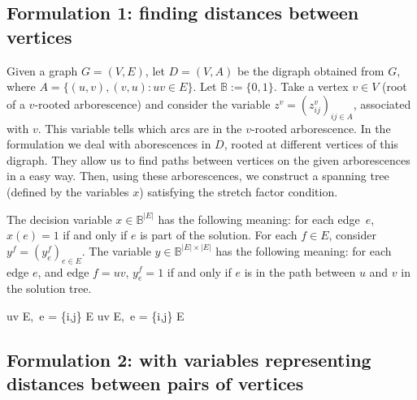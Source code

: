 \documentclass[12pt]{article}
\newcommand{\espacoXBinary}{\mathbb{B}^{|E|}}
\newcommand{\espacoYBinary}{\mathbb{B}^{|E| \times |E|}}
\newenvironment{absolutelynopagebreak}
  {\par\nobreak\vfil\penalty0\vfilneg
   \vtop\bgroup}
  {\par\xdef\tpd{\the\prevdepth}\egroup
   \prevdepth=\tpd}
\begin{document}
\subsection{Formulation 1: finding distances between vertices}
Given a graph $G=(V,E)$, let $D=(V,A)$ be the digraph obtained
from $G$, where $A = \{(u,v),(v,u): uv \in E\}$. Let
$\mathbb{B}:=\{0,1\}$. Take a vertex $v \in V$ (root of a \hbox{$v$-rooted}
arborescence) and consider the variable
$z^{v} = (z_{ij}^{v})_{ij \in A}$, associated with $v$. This variable
tells which arcs are in the $v$-rooted arborescence. 
%
In the formulation we deal with aborescences in $D$, rooted at
different vertices of this digraph. They allow us to find paths
between vertices on the given arborescences in a easy way. Then, using
these arborescences, we construct a spanning tree (defined by the
variables $x$) satisfying the stretch factor condition.

The decision variable $x \in \espacoXBinary$ has the following
meaning: for each edge~$e$, \hbox{$x(e) = 1$} if and only if $e$ is part of
the solution.  For each $f \in E$, consider
$y^{f} = (y^{f}_{e})_{e \in E}$. The variable $y \in \espacoYBinary$
has the following meaning: for each edge $e$, and edge \hbox{$f=uv$,}
$y^{f}_{e} = 1$ if and only if $e$ is in the path between $u$ and $v$
in the solution tree.
%
%
  \begin{lpformulation} %
     {uv \in E,\, \forall e = \{i,j\} \in E}
     {uv \in E,\, \forall e = \{i,j\} \in E}
    \lpeq[]{x \in \espacoXBinary, y \in \espacoYBinary, z^{v} \in \espacoYBinary}{v \in V}
\end{lpformulation}

  \subsection{Formulation 2: with variables representing distances between pairs of vertices}
 
\end{document}
